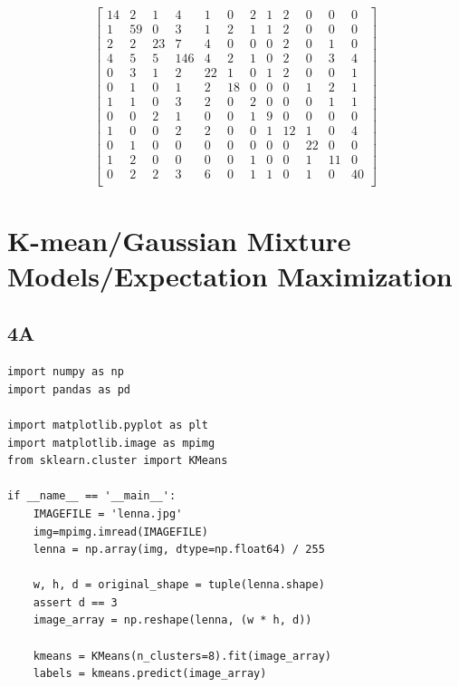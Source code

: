 \documentclass[12pt]{article}
\begin{document}
\begin{flushleft}
\setcounter{MaxMatrixCols}{12}
\[
\begin{bmatrix}
14  &2   &1   &4   &1   &0   &2   &1   &2   &0   &0   &0\\
1   &59  &0   &3   &1   &2   &1   &1   &2   &0   &0   &0\\
2   &2   &23  &7   &4   &0   &0   &0   &2   &0   &1   &0\\
4   &5   &5   &146 &4   &2   &1   &0   &2   &0   &3   &4\\
0   &3   &1   &2   &22  &1   &0   &1   &2   &0   &0   &1\\
0   &1   &0   &1   &2   &18  &0   &0   &0   &1   &2   &1\\
1   &1   &0   &3   &2   &0   &2   &0   &0   &0   &1   &1\\
0   &0   &2   &1   &0   &0   &1   &9   &0   &0   &0   &0\\
1   &0   &0   &2   &2   &0   &0   &1   &12  &1   &0   &4\\
0   &1   &0   &0   &0   &0   &0   &0   &0   &22  &0   &0\\
1   &2   &0   &0   &0   &0   &1   &0   &0   &1   &11  &0\\
0   &2   &2   &3   &6   &0   &1   &1   &0   &1   &0   &40\\
\end{bmatrix}
\]
		
		
		\section{K-mean/Gaussian Mixture Models/Expectation Maximization}
		
		\subsection*{4A}
		
			\begin{lstlisting}
import numpy as np 
import pandas as pd

import matplotlib.pyplot as plt
import matplotlib.image as mpimg
from sklearn.cluster import KMeans

if __name__ == '__main__':
	IMAGEFILE = 'lenna.jpg'
	img=mpimg.imread(IMAGEFILE)
	lenna = np.array(img, dtype=np.float64) / 255
	
	w, h, d = original_shape = tuple(lenna.shape)
	assert d == 3
	image_array = np.reshape(lenna, (w * h, d))
	
	kmeans = KMeans(n_clusters=8).fit(image_array)
	labels = kmeans.predict(image_array)
	

\end{lstlisting}
\end{flushleft}
\end{document}

